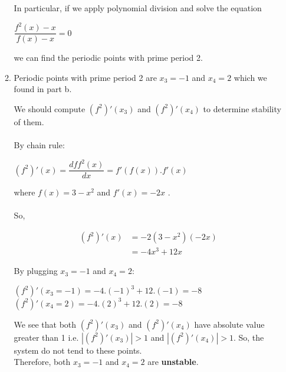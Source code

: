 \documentclass[12pt,a4paper, margin=1in]{article}
\begin{document}
\begin{enumerate}
\begin{enumerate}
            In particular, if we apply polynomial division and solve the equation
            \begin{center}
                $\dfrac{f^2(x) - x}{f(x) - x} = 0$
            \end{center}
            we can find the periodic points with prime period 2.
            
            
\newpage    
            \item Periodic points with prime period 2 are $x_3 = -1$ and $x_4 = 2$ which we found in part b.

            We should compute $(f^2)'(x_3)$ and $(f^2)'(x_4)$ to determine stability of them. \\ \\
            By chain rule: 
            \begin{center}
                $(f^2)'(x) = \dfrac{dff^2(x)}{dx} = f'(f(x)).f'(x)$
            \end{center}
            where $f(x) = 3 - x^2$ and $f'(x) = - 2x$ . \\ \\ So,

            \begin{center}
            \begin{equation*}
            \begin{split}
                 (f^2)'(x) & = -2 (3-x^2)(-2x) \\
                 & = -4x^3 + 12x
            \end{split}
            \end{equation*}    
            \end{center}

            By plugging $x_3 = -1$ and $x_4 = 2$:
            \begin{center}
                $(f^2)'(x_3 = -1) = -4.(-1)^3 + 12.(-1) = -8$ \\ 
                $(f^2)'(x_4 = 2) = -4.(2)^3 + 12.(2) = -8$ \\      
            \end{center}

            We see that both $(f^2)'(x_3)$ and  $(f^2)'(x_4)$ have absolute value greater than 1 i.e. $|(f^2)'(x_3)| > 1$ and $|(f^2)'(x_4)| > 1$. So, the system do not tend to these points. \\

            Therefore, both $x_3 = -1$ and $x_4 = 2$ are \textbf{unstable}. 
            
        \end{enumerate}


\end{enumerate}
\end{document}
